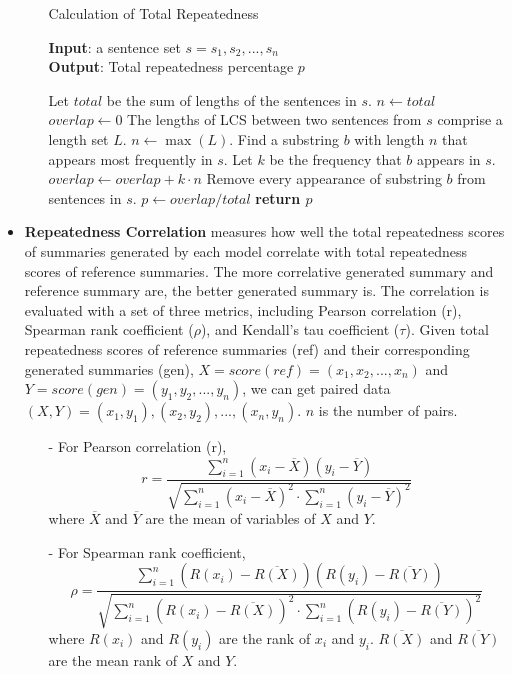 \begin{itemize}
\begin{itemize}
\begin{algorithm}[th]
\caption{Calculation of Total Repeatedness}
\label{alg:red}
\textbf{Input}: a sentence set $s = {s_{1}, s_{2},...,s_{n}}$\\
\textbf{Output}: Total repeatedness percentage $p$
\begin{algorithmic}[1] %
\STATE Let $total$ be the sum of lengths of the sentences in $s$.
\STATE $n \leftarrow total$
\STATE $overlap \leftarrow 0$
\STATE The lengths of LCS between two sentences from $s$ comprise a length set $L$.
\STATE $n \leftarrow \max(L)$.
\STATE Find a substring $b$ with length $n$ that appears most frequently in $s$.
\STATE Let $k$ be the frequency that $b$ appears in $s$.
\STATE $overlap \leftarrow overlap + k\cdot n$
\STATE Remove every appearance of substring $b$ from sentences in $s$.
\ENDWHILE
\STATE $p \leftarrow overlap/total$
\STATE \textbf{return $p$} 
\end{algorithmic}
\end{algorithm}
\end{itemize}

\item \textbf{Repeatedness Correlation} 
measures how well 
the total repeatedness scores of summaries generated by each model
correlate with total repeatedness scores of reference summaries. 
The more correlative generated summary and reference summary are,
the better generated summary is.
The correlation is evaluated with a set of
three metrics, including Pearson correlation (r),
Spearman rank coefficient ($\rho$), and Kendall's tau coefficient ($\tau$).
Given total repeatedness scores of reference summaries (ref) and 
their corresponding generated summaries (gen),
$X=score(ref)=(x_1, x_2,..., x_n)$ and 
$Y=score(gen)=(y_1, y_2,..., y_n)$, 
we can get paired data $(X,Y)={(x_1, y_1), (x_2, y_2),..., (x_n, y_n)}$.
$n$ is the number of pairs.
\begin{itemize}	
\item[-] For Pearson correlation (r),
\begin{equation}
r = \frac{\sum_{i=1}^{n}(x_i - \overline{X})(y_i - \overline{Y})}
	{\sqrt{\sum_{i=1}^{n}(x_i - \overline{X})^{2}\cdot\sum_{i=1}^{n}(y_i - \overline{Y})^{2}}}
\end{equation}
where $\overline{X}$ and $\overline{Y}$ are the mean of variables of $X$ and $Y$.

\item[-] For Spearman rank coefficient,
\begin{equation}
\rho = \frac{\sum_{i=1}^{n}(R(x_i) - \overline{R(X)})(R(y_i) - \overline{R(Y)})}
	  {\sqrt{\sum_{i=1}^{n}(R(x_i) - \overline{R(X)})^{2}
	  \cdot\sum_{i=1}^{n}(R(y_i)-\overline{R(Y)})^{2}}}
\end{equation}
where $R(x_i)$ and $R(y_i)$ are the rank of $x_i$ and $y_i$.
$\overline{R(X)}$ and $\overline{R(Y)}$ are the mean rank of $X$ and $Y$.


\end{itemize}
\end{itemize}
